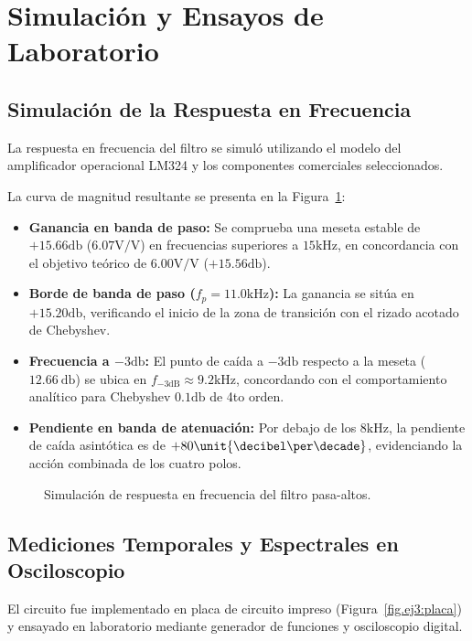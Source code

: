 \section{Simulación y Ensayos de Laboratorio}

\subsection{Simulación de la Respuesta en Frecuencia}
La respuesta en frecuencia del filtro se simuló utilizando el modelo del amplificador operacional LM324 y los
componentes comerciales seleccionados.

La curva de magnitud resultante se presenta en la Figura~\ref{fig.ej3:bode_ac}:
\begin{itemize}
    \item \textbf{Ganancia en banda de paso:} Se comprueba una meseta estable de $+15.66 \unit{\decibel}$ ($6.07
        \unit{\volt\per\volt}$) en frecuencias superiores a $15 \unit{\kilo\hertz}$, en concordancia con el objetivo
        teórico de $6.00 \unit{\volt\per\volt}$ ($+15.56 \unit{\decibel}$).
    \item \textbf{Borde de banda de paso ($f_p = 11.0 \unit{\kilo\hertz}$):} La ganancia se sitúa en $+15.20
        \unit{\decibel}$, verificando el inicio de la zona de transición con el rizado acotado de Chebyshev.
    \item \textbf{Frecuencia a $-3 \unit{\decibel}$:} El punto de caída a $-3 \unit{\decibel}$ respecto a la meseta
        ($\SI{12.66}{\decibel}$) se ubica en $f_{-3\text{dB}} \approx 9.2 \unit{\kilo\hertz}$, concordando con el
        comportamiento analítico para Chebyshev $0.1 \unit{\decibel}$ de 4to orden.
    \item \textbf{Pendiente en banda de atenuación:} Por debajo de los $8 \unit{\kilo\hertz}$, la pendiente de caída
        asintótica es de $+80 \unit{\decibel\per\decade}$, evidenciando la acción combinada de los cuatro polos.
\end{itemize}

\begin{figure}[!ht]
    \centering
    
    \caption{Simulación de respuesta en frecuencia del filtro pasa-altos.}
    \label{fig.ej3:bode_ac}
\end{figure}

\subsection{Mediciones Temporales y Espectrales en Osciloscopio}
El circuito fue implementado en placa de circuito impreso (Figura~\ref{fig.ej3:placa}) y ensayado en laboratorio
mediante generador de funciones y osciloscopio digital.

